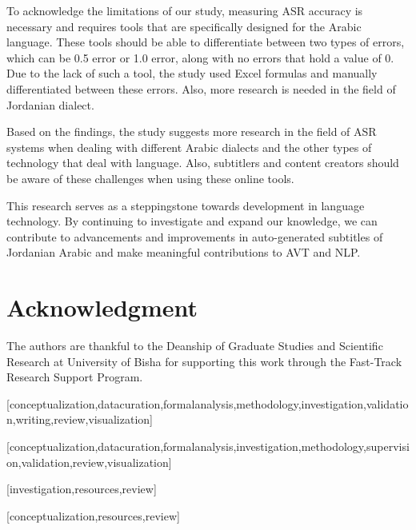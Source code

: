 \documentclass[english]{textolivre}
\begin{document}
To acknowledge the limitations of our study, measuring ASR accuracy is
necessary and requires tools that are specifically designed for the
Arabic language. These tools should be able to differentiate between two
types of errors, which can be 0.5 error or 1.0 error, along with no
errors that hold a value of 0. Due to the lack of such a tool, the study
used Excel formulas and manually differentiated between these errors.
Also, more research is needed in the field of Jordanian dialect.

Based on the findings, the study suggests more research in the field of
ASR systems when dealing with different Arabic dialects and the other
types of technology that deal with language. Also, subtitlers and
content creators should be aware of these challenges when using these
online tools.

This research serves as a steppingstone towards development in language
technology. By continuing to investigate and expand our knowledge, we
can contribute to advancements and improvements in auto-generated
subtitles of Jordanian Arabic and make meaningful contributions to AVT
and NLP.

\section*{Acknowledgment}
	
The authors are thankful to the Deanship of Graduate Studies and Scientific Research at University of Bisha for supporting this work through the Fast-Track Research Support Program.
	

\printbibliography\label{sec-bib}
	
	
\begin{contributors}
	[conceptualization,datacuration,formalanalysis,methodology,investigation,validation,writing,review,visualization]
	
	[conceptualization,datacuration,formalanalysis,investigation,methodology,supervision,validation,review,visualization]
	
	[investigation,resources,review]
	
	[conceptualization,resources,review]
\end{contributors}
	
	
\end{document}
